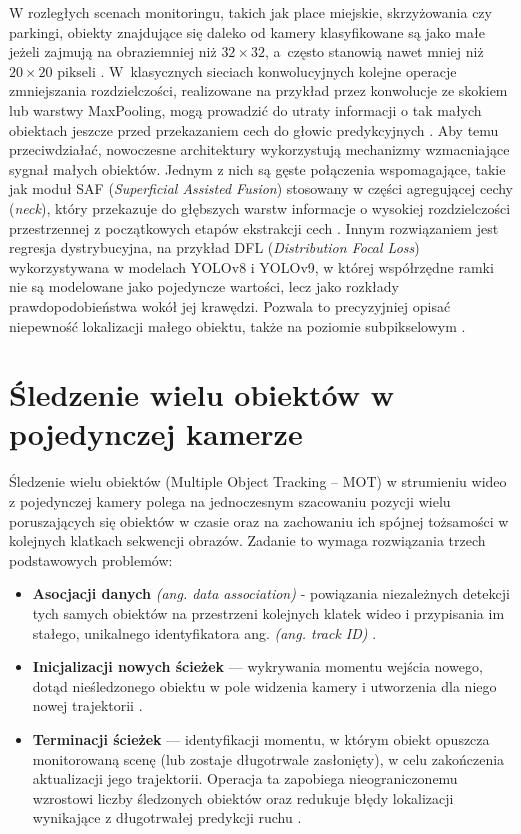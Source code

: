 W rozległych scenach monitoringu, takich jak place miejskie, skrzyżowania czy parkingi, obiekty
znajdujące się daleko od kamery klasyfikowane są jako małe jeżeli zajmują na obraziemniej niż $32
  \times 32$, a~często stanowią nawet mniej niż $20 \times 20$ pikseli \cite{nikouei2025}.
W~klasycznych sieciach konwolucyjnych kolejne operacje zmniejszania rozdzielczości, realizowane na
przykład przez konwolucje ze skokiem lub warstwy MaxPooling, mogą prowadzić do utraty informacji o
tak małych obiektach jeszcze przed przekazaniem cech do głowic predykcyjnych \cite{nikouei2025}.
Aby temu przeciwdziałać, nowoczesne architektury wykorzystują mechanizmy wzmacniające sygnał małych
obiektów. Jednym z nich są gęste połączenia wspomagające, takie jak moduł SAF (\textit{Superficial
  Assisted Fusion}) stosowany w części agregującej cechy (\textit{neck}), który przekazuje do
głębszych warstw informacje o wysokiej rozdzielczości przestrzennej z początkowych etapów
ekstrakcji cech \cite{yang2024}. Innym rozwiązaniem jest regresja dystrybucyjna, na przykład DFL
(\textit{Distribution Focal Loss}) wykorzystywana w modelach YOLOv8 i YOLOv9, w której współrzędne
ramki nie są modelowane jako pojedyncze wartości, lecz jako rozkłady prawdopodobieństwa wokół jej
krawędzi. Pozwala to precyzyjniej opisać niepewność lokalizacji małego obiektu, także na poziomie
subpikselowym \cite{yang2024}.

\section{Śledzenie wielu obiektów w pojedynczej kamerze}

Śledzenie wielu obiektów (Multiple Object Tracking – MOT) w strumieniu wideo z pojedynczej kamery polega na jednoczesnym szacowaniu pozycji wielu poruszających się obiektów w czasie oraz na zachowaniu ich spójnej tożsamości w kolejnych klatkach sekwencji obrazów. Zadanie to wymaga rozwiązania trzech podstawowych problemów:
\begin{itemize}
  \item \textbf{Asocjacji danych} \textit{(ang. data association)} - powiązania niezależnych detekcji tych samych obiektów na przestrzeni kolejnych klatek wideo i przypisania im stałego, unikalnego identyfikatora ang. \textit{(ang. track ID)} \cite{bewley2016}.
  \item \textbf{Inicjalizacji nowych ścieżek} — wykrywania momentu wejścia nowego, dotąd nieśledzonego obiektu w pole widzenia kamery i utworzenia dla niego nowej trajektorii \cite{bewley2016}.
  \item \textbf{Terminacji ścieżek} — identyfikacji momentu, w którym obiekt opuszcza monitorowaną scenę (lub zostaje długotrwale zasłonięty), w celu zakończenia aktualizacji jego trajektorii. Operacja ta zapobiega nieograniczonemu wzrostowi liczby śledzonych obiektów oraz redukuje błędy lokalizacji wynikające z długotrwałej predykcji ruchu \cite{bewley2016}.
\end{itemize}
